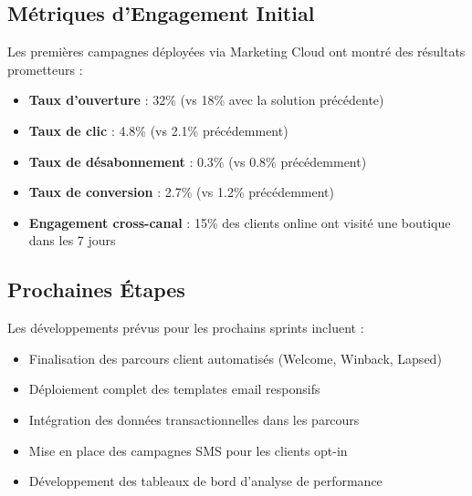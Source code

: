 \subsection{Métriques d'Engagement Initial}

\begin{mdframed}[backgroundcolor=lightgreen!20, linewidth=1pt]
Les premières campagnes déployées via Marketing Cloud ont montré des résultats prometteurs :

\begin{itemize}
    \item \textbf{Taux d'ouverture} : 32\% (vs 18\% avec la solution précédente)
    \item \textbf{Taux de clic} : 4.8\% (vs 2.1\% précédemment)
    \item \textbf{Taux de désabonnement} : 0.3\% (vs 0.8\% précédemment)
    \item \textbf{Taux de conversion} : 2.7\% (vs 1.2\% précédemment)
    \item \textbf{Engagement cross-canal} : 15\% des clients online ont visité une boutique dans les 7 jours
\end{itemize}
\end{mdframed}

\subsection{Prochaines Étapes}

Les développements prévus pour les prochains sprints incluent :

\begin{itemize}
    \item Finalisation des parcours client automatisés (Welcome, Winback, Lapsed)
    \item Déploiement complet des templates email responsifs
    \item Intégration des données transactionnelles dans les parcours
    \item Mise en place des campagnes SMS pour les clients opt-in
    \item Développement des tableaux de bord d'analyse de performance
\end{itemize}
